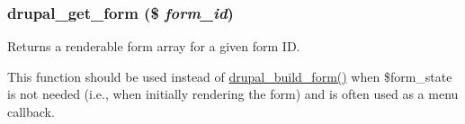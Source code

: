 \hypertarget{group__form__api_ga720df81a837b06dfe19daf1c1eea3437}{
\subsubsection[{drupal\_\-get\_\-form}]{\setlength{\rightskip}{0pt plus 5cm}drupal\_\-get\_\-form (\$ {\em form\_\-id})}}
\label{group__form__api_ga720df81a837b06dfe19daf1c1eea3437}
Returns a renderable form array for a given form ID.

This function should be used instead of \hyperlink{group__form__api_gabead4b3c089fd605421d371a0315c4d7}{drupal\_\-build\_\-form()} when \$form\_\-state is not needed (i.e., when initially rendering the form) and is often used as a menu callback.


